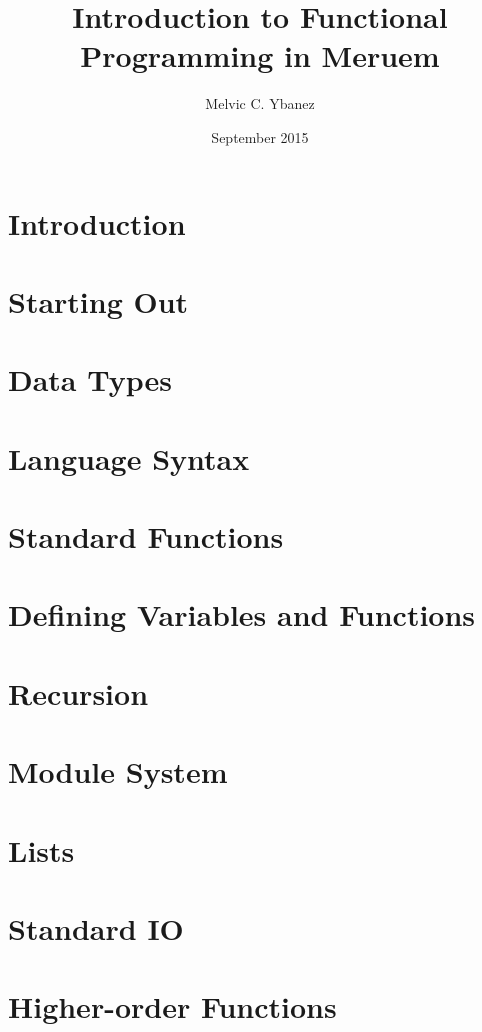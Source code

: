 \documentclass[12pt, twoside, obeyspaces]{report}
\title{Introduction to Functional Programming in Meruem}
\author{Melvic C. Ybanez}
\date{September 2015}
\begin{document}
	\maketitle
	
	\tableofcontents
	
	\chapter*{Introduction}
		
	
	\chapter{Starting Out}
	
	
	\chapter{Data Types}
	
	
	\chapter{Language Syntax}
	
	
	\chapter{Standard Functions}
	\label{ch:standard-functions}
	
	
	\chapter{Defining Variables and Functions}
	
	
	\chapter{Recursion}
	
	
	\chapter{Module System}
	
	
	\chapter{Lists}
	
	
	\chapter{Standard IO}
	
	
	\chapter{Higher-order Functions}
	
\end{document}
